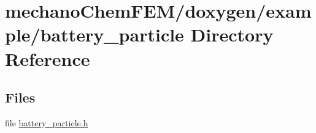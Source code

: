 \section{mechano\-Chem\-F\-E\-M/doxygen/example/battery\-\_\-particle Directory Reference}
\label{dir_f5782c6066440fe39829c0e06f940fb3}
\subsection*{Files}
\begin{DoxyCompactItemize}
\item 
file \hyperlink{battery__particle_8h}{battery\-\_\-particle.\-h}
\end{DoxyCompactItemize}
